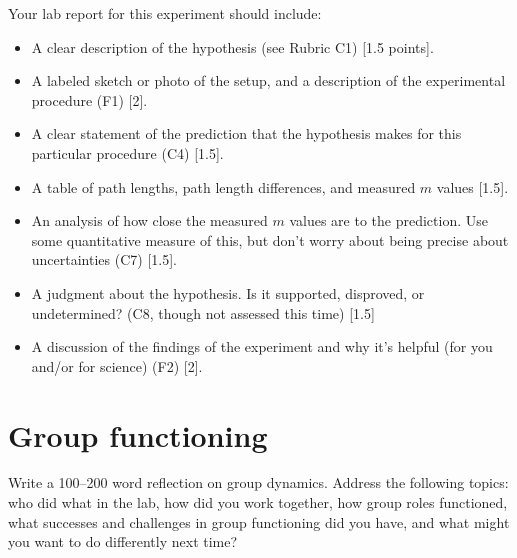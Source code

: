 Your lab report for this experiment should include:
\begin{itemize}
	\item A clear description of the hypothesis (see Rubric C1) [1.5 points].
	
	\item A labeled sketch or photo of the setup, and a description of the experimental procedure (F1) [2].
	
	\item A clear statement of the prediction that the hypothesis makes for this particular procedure (C4) [1.5].

	\item A table of path lengths, path length differences, and measured $m$ values [1.5].
	
	\item An analysis of how close the measured $m$ values are to the prediction. Use some quantitative measure of this, but don't worry about being precise about uncertainties (C7) [1.5].
	
	\item A judgment about the hypothesis. Is it supported, disproved, or undetermined? (C8, though not assessed this time) [1.5]
	
	\item A discussion of the findings of the experiment and why it's helpful (for you and/or for science) (F2) [2].
\end{itemize}

\section{Group functioning}

\begin{steps}
	\item Write a 100--200 word reflection on group dynamics. Address the following topics: who did what in the lab, how did you work together, how group roles functioned, what successes and challenges in group functioning did you have, and what might you want to do differently next time?
\end{steps}

